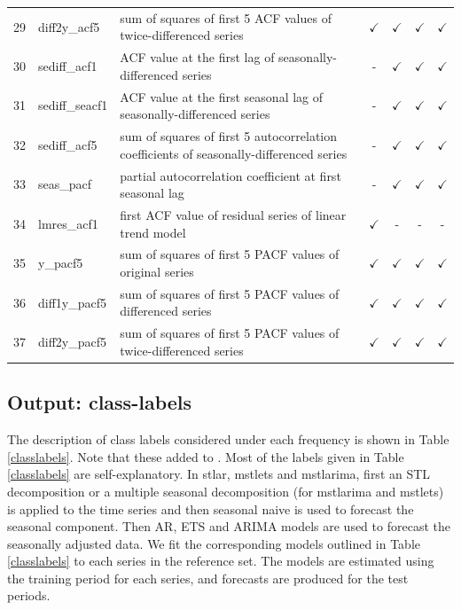 \documentclass[11pt,a4paper,]{article}
\def\yes{$\checkmark$}
\begin{document}
\begin{table}[!htp]
\begin{tabular}{llp{}cccc}
29 & diff2y\_acf5   & sum of squares of first 5 ACF values of twice-differenced series                        & \yes  & \yes & \yes & \yes \\
30 & sediff\_acf1 & ACF value at the first lag of seasonally-differenced series                               & -     & \yes & \yes & \yes\\
31 & sediff\_seacf1 & ACF value at the first seasonal lag of seasonally-differenced series                    & -     & \yes & \yes & \yes\\
32 & sediff\_acf5   & sum of squares of first 5 autocorrelation coefficients of seasonally-differenced series & -     & \yes & \yes & \yes\\
33 & seas\_pacf     & partial autocorrelation coefficient at first seasonal lag & -     & \yes & \yes & \yes\\
34 & lmres\_acf1    & first ACF value of residual series of linear trend model                                & \yes  & - & - & -\\
35 & y\_pacf5       & sum of squares of first 5 PACF values of original series                                & \yes  & \yes & \yes & \yes\\
36 & diff1y\_pacf5  & sum of squares of first 5 PACF values of differenced series                             & \yes  & \yes & \yes & \yes\\
37 & diff2y\_pacf5  & sum of squares of first 5 PACF values of twice-differenced series                       & \yes  & \yes & \yes & \yes\\
\bottomrule
\end{tabular}
\end{table}

\hypertarget{output-class-labels}{%
\subsection{Output: class-labels}\label{output-class-labels}}

The description of class labels considered under each frequency is shown in Table \ref{classlabels}. Note that these added to \textcite{fforms}. Most of the labels given in Table \ref{classlabels} are self-explanatory. In stlar, mstlets and mstlarima, first an STL decomposition or a multiple seasonal decomposition (for mstlarima and mstlets) is applied to the time series and then seasonal naive is used to forecast the seasonal component. Then AR, ETS and ARIMA models are used to forecast the seasonally adjusted data. We fit the corresponding models outlined in Table \ref{classlabels} to each series in the reference set. The models are estimated using the training period for each series, and forecasts are produced for the test periods.
\end{document}
